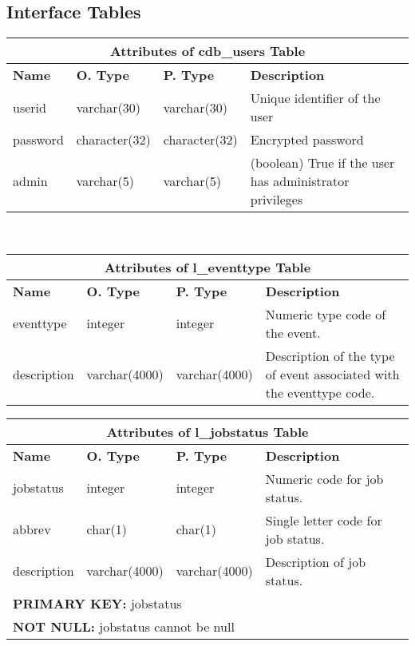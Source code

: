 \subsection{Interface Tables}
\begin{center}
  \begin{tabular}{|l|l|l|p{3.4in}|}\hline
    \multicolumn{4}{|c|}{\textbf{Attributes of cdb\_users Table}}\\ \hline
    \textbf{Name} & \textbf{O. Type} & \textbf{P. Type} & \textbf{Description}\\ \hline
    userid & varchar(30) & varchar(30) & Unique identifier of the user\\ \hline
    password & character(32) & character(32) & Encrypted password\\ \hline
    admin & varchar(5) & varchar(5) & (boolean) True if the user has administrator privileges\\ \hline
  \end{tabular}\\
\vspace{24pt}

  \begin{tabular}{|l|l|l|p{3.2in}|}\hline
    \multicolumn{4}{|c|}{\textbf{Attributes of l\_eventtype Table}}\\ \hline
    \textbf{Name} & \textbf{O. Type} & \textbf{P. Type} & \textbf{Description}\\ \hline
    eventtype & integer & integer & Numeric type code of the event.\\ \hline
    description & varchar(4000) & varchar(4000) & Description of the type of event associated with the eventtype code.\\ \hline
  \end{tabular}
\vspace{24pt}

  \begin{tabular}{|l|l|l|p{3.2in}|}\hline
    \multicolumn{4}{|c|}{\textbf{Attributes of l\_jobstatus Table}}\\ \hline
    \textbf{Name} & \textbf{O. Type} & \textbf{P. Type} & \textbf{Description}\\ \hline
    jobstatus & integer & integer & Numeric code for job status.\\ \hline
    abbrev & char(1) & char(1) & Single letter code for job status.\\ \hline
    description & varchar(4000) & varchar(4000) & Description of job status.\\ \hline
    \multicolumn{4}{|l|}{\textbf{PRIMARY KEY:} jobstatus} \\ \hline
    \multicolumn{4}{|l|}{\textbf{NOT NULL:} jobstatus cannot be null} \\ \hline
  \end{tabular}
\vspace{24pt}
\end{center}


